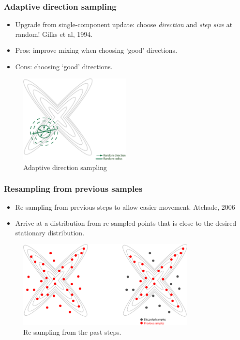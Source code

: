 \documentclass[10pt]{beamer}
\begin{document}
\begin{frame}
	\frametitle{Adaptive direction sampling}
	\begin{itemize}
		\item Upgrade from single-component update: choose \textit{direction} and \textit{step size} at random! \tiny{Gilks et al, 1994.} \normalsize
		\item Pros: improve mixing when choosing `good' directions.
		\item Cons: choosing `good' directions.
	\end{itemize}
	\begin{figure}[h]
		\centering
		\includegraphics[width=0.5\textwidth]{adaptive-direction}
		\caption{Adaptive direction sampling}
	\end{figure}	
\end{frame}

\begin{frame}
	\frametitle{Resampling from previous samples}
	\begin{itemize}
		\item Re-sampling from previous steps to allow easier movement. \tiny{Atchade, 2006} \normalsize
		\item Arrive at a distribution from re-sampled points that is close to the desired stationary distribution.
	\end{itemize}
	\begin{figure}[h]
		\centering
		\includegraphics[width=0.8\textwidth]{resampling}
		\caption{Re-sampling from the past steps.}
	\end{figure}	
\end{frame}
\end{document}
